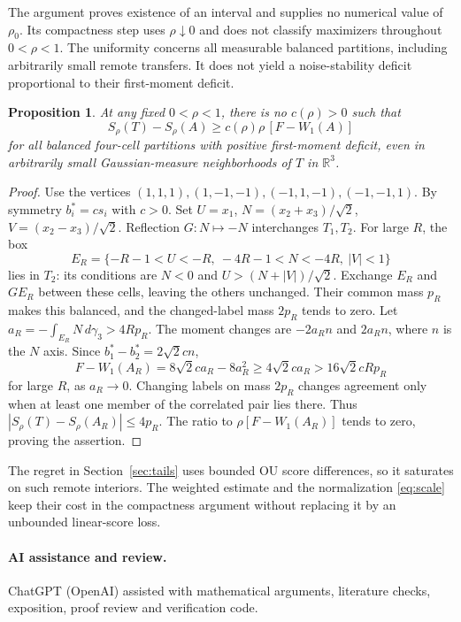 \documentclass[11pt,reqno]{amsart}
\newtheorem{proposition}[theorem]{Proposition}
\theoremstyle{remark}
\newcommand{\R}{\mathbb R}
\newcommand{\ga}{\gamma}
\begin{document}
The argument proves existence of an interval and supplies no numerical
value of $\rho_0$. Its compactness step uses $\rho\downarrow0$ and
does not classify maximizers throughout $0<\rho<1$.
The uniformity concerns all measurable balanced partitions, including
arbitrarily small remote transfers. It does not yield a noise-stability
deficit proportional to their first-moment deficit.

\begin{proposition}\label{prop:obstruction}
At any fixed $0<\rho<1$, there is no $c(\rho)>0$ such that
\[
 S_\rho(T)-S_\rho(A)\ge c(\rho)\rho\,[F-W_1(A)]
\]
for all balanced four-cell partitions with positive first-moment deficit,
even in arbitrarily small Gaussian-measure neighborhoods of $T$ in $\R^3$.
\end{proposition}

\begin{proof}
Use the vertices $(1,1,1),(1,-1,-1),(-1,1,-1),(-1,-1,1)$.
By symmetry $b_i^*=c s_i$ with $c>0$.
Set $U=x_1$, $N=(x_2+x_3)/\sqrt2$, $V=(x_2-x_3)/\sqrt2$.
Reflection $G:N\mapsto-N$ interchanges $T_1,T_2$.
For large $R$, the box
\[
 E_R=\{-R-1<U<-R,\ -4R-1<N<-4R,\ |V|<1\}
\]
lies in $T_2$: its conditions are $N<0$ and
$U>(N+|V|)/\sqrt2$. Exchange $E_R$ and $GE_R$ between these cells,
leaving the others unchanged. Their common mass $p_R$ makes this balanced,
and the changed-label mass $2p_R$ tends to zero.
Let $a_R=-\int_{E_R}N\,d\ga_3>4Rp_R$.
The moment changes are $-2a_R n$ and $2a_R n$, where $n$ is the $N$ axis.
Since $b_1^*-b_2^*=2\sqrt2c n$,
\[
 F-W_1(A_R)=8\sqrt2c a_R-8a_R^2
 \ge4\sqrt2c a_R>16\sqrt2c Rp_R
\]
for large $R$, as $a_R\to0$.
Changing labels on mass $2p_R$ changes agreement only when at least one
member of the correlated pair lies there. Thus
$|S_\rho(T)-S_\rho(A_R)|\le4p_R$.
The ratio to $\rho[F-W_1(A_R)]$ tends to zero, proving the assertion.
\end{proof}

The regret in Section~\ref{sec:tails} uses bounded OU score differences,
so it saturates on such remote interiors. The weighted estimate and the
normalization \eqref{eq:scale} keep their cost in the compactness argument
without replacing it by an unbounded linear-score loss.

\paragraph{AI assistance and review.}
ChatGPT (OpenAI) assisted with mathematical arguments, literature checks,
exposition, proof review and verification code.
\end{document}
